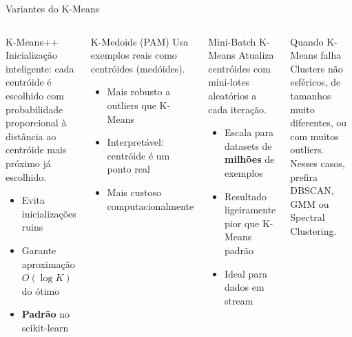 \documentclass[aspectratio=169]{beamer}
\begin{document}
\begin{frame}[shrink=5]{Variantes do K-Means}
    \begin{columns}
        \begin{block}{K-Means++}
            \footnotesize
            Inicialização inteligente: cada centróide é escolhido com probabilidade proporcional à distância ao centróide mais próximo já escolhido.
            \begin{itemize}\footnotesize
                \item Evita inicializações ruins
                \item Garante aproximação $O(\log K)$ do ótimo
                \item \textbf{Padrão} no scikit-learn
            \end{itemize}
        \end{block}
        \begin{block}{K-Medoids (PAM)}
            \footnotesize
            Usa exemplos reais como centróides (medóides).
            \begin{itemize}\footnotesize
                \item Mais robusto a outliers que K-Means
                \item Interpretável: centróide é um ponto real
                \item Mais custoso computacionalmente
            \end{itemize}
        \end{block}
        \begin{block}{Mini-Batch K-Means}
            \footnotesize
            Atualiza centróides com mini-lotes aleatórios a cada iteração.
            \begin{itemize}\footnotesize
                \item Escala para datasets de \textbf{milhões} de exemplos
                \item Resultado ligeiramente pior que K-Means padrão
                \item Ideal para dados em stream
            \end{itemize}
        \end{block}
        \begin{alertblock}{Quando K-Means falha}
            \footnotesize Clusters não esféricos, de tamanhos muito diferentes, ou com muitos outliers. Nesses casos, prefira DBSCAN, GMM ou Spectral Clustering.
        \end{alertblock}
    \end{columns}
\end{frame}
\end{document}
